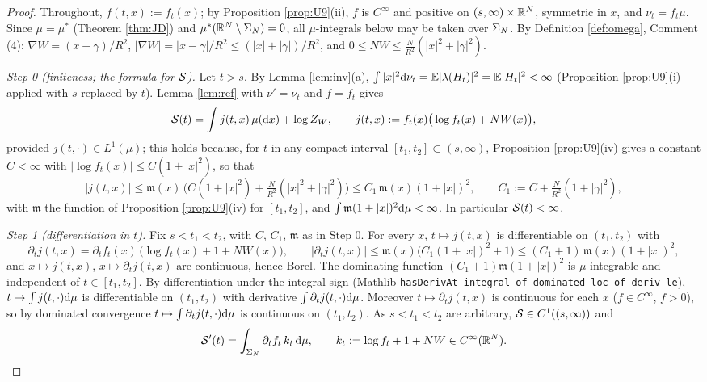 \begin{proof}
Throughout, $f(t,x):=f_t(x)$; by Proposition \ref{prop:U9}(ii), $f$ is $C^\infty$ and positive on $(s,\infty)\times\mathbb{R}^N$, symmetric in $x$, and $\nu_t=f_t\mu$. Since $\mu=\mu^*$ (Theorem \ref{thm:JD}) and $\mu^*(\mathbb{R}^N\setminus\Sigma_N)=0$, all $\mu$-integrals below may be taken over $\Sigma_N$.
By Definition \ref{def:omega}, Comment (4): $\nabla W=(x-\gamma)/R^2$, $|\nabla W|=|x-\gamma|/R^2\le(|x|+|\gamma|)/R^2$, and $0\le NW\le\frac N{R^2}(|x|^2+|\gamma|^2)$.

\emph{Step 0 (finiteness; the formula for $\mathcal{S}$).} Let $t>s$. By Lemma \ref{lem:inv}(a), $\int|x|^2\mathrm{d}\nu_t=\mathbb{E}|\lambda(H_t)|^2=\mathbb{E}|H_t|^2<\infty$ (Proposition \ref{prop:U9}(i) applied with $s$ replaced by $t$). Lemma \ref{lem:ref} with $\nu'=\nu_t$ and $f=f_t$ gives
\begin{equation}\label{c7:Sj}
\mathcal{S}(t)=\int j(t,x)\,\mu(\mathrm{d} x)+\log Z_W,\qquad j(t,x):=f_t(x)\big(\log f_t(x)+NW(x)\big),
\end{equation}
provided $j(t,\cdot)\in L^1(\mu)$; this holds because, for $t$ in any compact interval $[t_1,t_2]\subset(s,\infty)$, Proposition \ref{prop:U9}(iv) gives a constant $C<\infty$ with $|\log f_t(x)|\le C(1+|x|^2)$, so that
\[
|j(t,x)|\le\mathfrak m(x)\,\big(C(1+|x|^2)+\tfrac N{R^2}(|x|^2+|\gamma|^2)\big)\le C_1\,\mathfrak m(x)(1+|x|)^2,\qquad C_1:=C+\tfrac N{R^2}(1+|\gamma|^2),
\]
with $\mathfrak m$ the function of Proposition \ref{prop:U9}(iv) for $[t_1,t_2]$, and $\int\mathfrak m(1+|x|)^2\mathrm{d}\mu<\infty$. In particular $\mathcal{S}(t)<\infty$.

\emph{Step 1 (differentiation in $t$).} Fix $s<t_1<t_2$, with $C$, $C_1$, $\mathfrak m$ as in Step 0. For every $x$, $t\mapsto j(t,x)$ is differentiable on $(t_1,t_2)$ with
\[
\partial_tj(t,x)=\partial_tf_t(x)\,\big(\log f_t(x)+1+NW(x)\big),\qquad |\partial_tj(t,x)|\le\mathfrak m(x)\big(C_1(1+|x|)^2+1\big)\le(C_1+1)\,\mathfrak m(x)(1+|x|)^2,
\]
and $x\mapsto j(t,x)$, $x\mapsto\partial_tj(t,x)$ are continuous, hence Borel. The dominating function $(C_1+1)\mathfrak m(1+|x|)^2$ is $\mu$-integrable and independent of $t\in[t_1,t_2]$.
By differentiation under the integral sign (Mathlib \texttt{hasDerivAt\_integral\_of\_dominated\_loc\_of\_deriv\_le}), $t\mapsto\int j(t,\cdot)\mathrm{d}\mu$ is differentiable on $(t_1,t_2)$ with derivative $\int\partial_tj(t,\cdot)\mathrm{d}\mu$.
Moreover $t\mapsto\partial_tj(t,x)$ is continuous for each $x$ ($f\in C^\infty$, $f>0$), so by dominated convergence $t\mapsto\int\partial_tj(t,\cdot)\mathrm{d}\mu$ is continuous on $(t_1,t_2)$. As $s<t_1<t_2$ are arbitrary, $\mathcal{S}\in C^1((s,\infty))$ and
\[
\mathcal{S}'(t)=\int_{\Sigma_N}\partial_tf_t\,k_t\,\mathrm{d}\mu,\qquad k_t:=\log f_t+1+NW\in C^\infty(\mathbb{R}^N).
\]


\end{proof}
